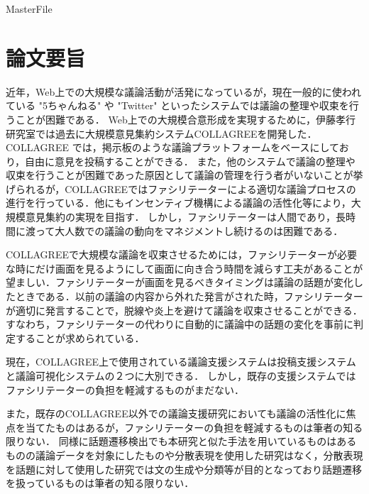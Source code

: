 \expandafter\ifx\csname MasterFile\endcsname\relax
\def\SubFile{hoge}


\fi
\cleardoublepage
\chapter*{論文要旨}
近年，Web上での大規模な議論活動が活発になっているが，現在一般的に使われている "5ちゃんねる" や "Twitter" といったシステムでは議論の整理や収束を行うことが困難である．
%
Web上での大規模合意形成を実現するために，伊藤孝行研究室では過去に大規模意見集約システムCOLLAGREEを開発した．
COLLAGREE では，掲示板のような議論プラットフォームをベースにしており，自由に意見を投稿することができる．
また，他のシステムで議論の整理や収束を行うことが困難であった原因として議論の管理を行う者がいないことが挙げられるが，COLLAGREEではファシリテーターによる適切な議論プロセスの進行を行っている．他にもインセンティブ機構による議論の活性化等により，大規模意見集約の実現を目指す．
しかし，ファシリテーターは人間であり，長時間に渡って大人数での議論の動向をマネジメントし続けるのは困難である．

COLLAGREEで大規模な議論を収束させるためには，ファシリテーターが必要な時にだけ画面を見るようにして画面に向き合う時間を減らす工夫があることが望ましい．ファシリテーターが画面を見るべきタイミングは議論の話題が変化したときである．以前の議論の内容から外れた発言がされた時，ファシリテーターが適切に発言することで，脱線や炎上を避けて議論を収束させることができる．
すなわち，ファシリテーターの代わりに自動的に議論中の話題の変化を事前に判定することが求められている．

現在，COLLAGREE上で使用されている議論支援システムは投稿支援システムと議論可視化システムの２つに大別できる．
しかし，既存の支援システムではファシリテーターの負担を軽減するものがまだない．
\begin{comment}
ポイント機能(ユーザの議論行動を活性化)-1
ファシリテーションフレーズ簡易投稿機能-1
議論ツリー-2
１文の要約，スレッドの要約，クラスタリング，返信意見の極性判定-2
ファシリテーションスタンプ-1
キーワード抽出-2
いいね機能-1
いいねランキング-2
投票機能-1
議論フェーズ機能-2
1-意見を出す，投稿をする際に補助や選択肢，リアクションを与える
2-議論の別の見方を提供する
\end{comment}
%
また，既存のCOLLAGREE以外での議論支援研究においても議論の活性化に焦点を当てたものはあるが，ファシリテーターの負担を軽減するものは筆者の知る限りない．
同様に話題遷移検出でも本研究と似た手法を用いているものはあるものの議論データを対象にしたものや分散表現を使用した研究はなく，分散表現を話題に対して使用した研究では文の生成や分類等が目的となっており話題遷移を扱っているものは筆者の知る限りない．


